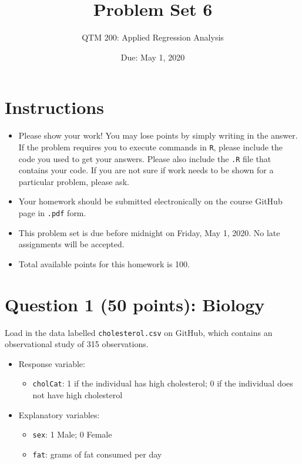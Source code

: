 \documentclass[12pt,letterpaper]{article}
\title{Problem Set 6}
\date{Due: May 1, 2020}
\author{QTM 200: Applied Regression Analysis}
\begin{document}
	\maketitle
	
	\section*{Instructions}
	\begin{itemize}
		\item Please show your work! You may lose points by simply writing in the answer. If the problem requires you to execute commands in \texttt{R}, please include the code you used to get your answers. Please also include the \texttt{.R} file that contains your code. If you are not sure if work needs to be shown for a particular problem, please ask.
		\item Your homework should be submitted electronically on the course GitHub page in \texttt{.pdf} form.
		\item This problem set is due before midnight on Friday, May 1, 2020. No late assignments will be accepted.
		\item Total available points for this homework is 100.
	\end{itemize}
	
	\vspace{.5cm}
\section*{Question 1 (50 points): Biology}
\vspace{.25cm}
\noindent Load in the data labelled \texttt{cholesterol.csv} on GitHub, which contains an observational study of 315 observations.

\begin{itemize}
	\item
	Response variable: 
	\begin{itemize}
		\item \texttt{cholCat}: 1 if the individual has high cholesterol; 0 if the individual does not have high cholesterol
	\end{itemize}
	\item
	Explanatory variables: 
	\begin{itemize}
		\item
		\texttt{sex}: 1 Male; 0 Female
		\item
		\texttt{fat}: grams of fat consumed per day
		
	\end{itemize}
	
\end{itemize}
\end{document}
